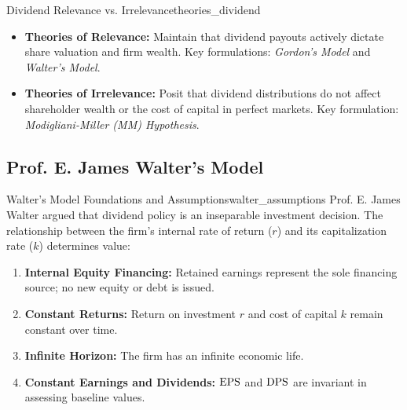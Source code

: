 \begin{definition}{Dividend Relevance vs. Irrelevance}{theories_dividend}
\begin{itemize}[leftmargin=*, noitemsep]
    \item \textbf{Theories of Relevance:} Maintain that dividend payouts actively dictate share valuation and firm wealth. Key formulations: \emph{Gordon's Model} and \emph{Walter's Model}.
    \item \textbf{Theories of Irrelevance:} Posit that dividend distributions do not affect shareholder wealth or the cost of capital in perfect markets. Key formulation: \emph{Modigliani-Miller (MM) Hypothesis}.
\end{itemize}
\end{definition}

\subsection{Prof. E. James Walter's Model}

\begin{definition}{Walter's Model Foundations and Assumptions}{walter_assumptions}
Prof. E. James Walter argued that dividend policy is an inseparable investment decision. The relationship between the firm's internal rate of return ($r$) and its capitalization rate ($k$) determines value:
\begin{enumerate}[noitemsep, leftmargin=*]
    \item \textbf{Internal Equity Financing:} Retained earnings represent the sole financing source; no new equity or debt is issued.
    \item \textbf{Constant Returns:} Return on investment $r$ and cost of capital $k$ remain constant over time.
    \item \textbf{Infinite Horizon:} The firm has an infinite economic life.
    \item \textbf{Constant Earnings and Dividends:} $\operatorname{EPS}$ and $\operatorname{DPS}$ are invariant in assessing baseline values.
\end{enumerate}
\end{definition}

